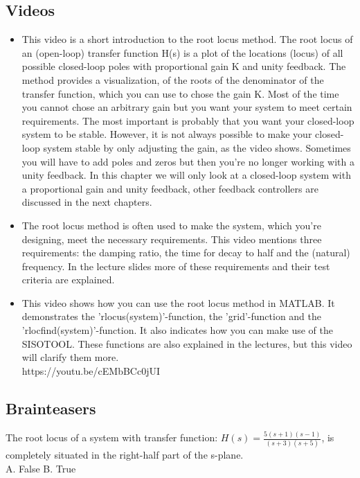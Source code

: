 \documentclass{document}
\begin{document}
	\subsection{Videos}
	\begin{itemize}
		\item This video is a short introduction to the root locus method. The root locus of an (open-loop) transfer function H(s) is a plot of the locations (locus) of all possible closed-loop poles with proportional gain K and unity feedback. The method provides a visualization, of the roots of the denominator of the transfer function, which you can use to chose the gain K. Most of the time you cannot chose an arbitrary gain but you want your system to meet certain requirements. The most important is probably that you want your closed-loop system to be stable. However, it is not always possible to make your closed-loop system stable by only adjusting the gain, as the video shows. Sometimes you will have to add poles and zeros but then you're no longer working with a unity feedback. In this chapter we will only look at a closed-loop system with a proportional gain and unity feedback, other feedback controllers are discussed in the next chapters.\\
		\item The root locus method is often used to make the system, which you're designing, meet the necessary requirements. This video mentions three requirements: the damping ratio, the time for decay to half and the (natural) frequency. In the lecture slides more of these requirements and their test criteria are explained.
		\item This video shows how you can use the root locus method in MATLAB. It demonstrates the 'rlocus(system)'-function, the 'grid'-function and the 'rlocfind(system)'-function. It also indicates how you can make use of the SISOTOOL. These functions are also explained in the lectures, but this video will clarify them more.\\
		https://youtu.be/cEMbBCc0jUI 
		
	\end{itemize}
	\subsection{Brainteasers}
	\item The root locus of a system with transfer function: $H(s)=\frac{5(s+1)(s−1)}{(s+3)(s+5)}$, is completely situated in the right-half part of the s-plane.\\
	A. False
	B. True
\end{document}
